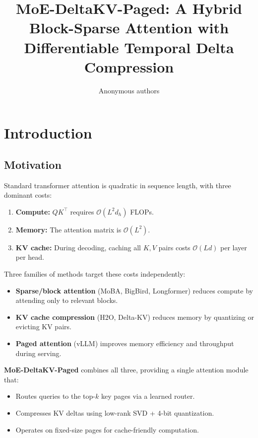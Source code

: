 \title{\textbf{MoE-DeltaKV-Paged: A Hybrid Block-Sparse Attention with Differentiable Temporal Delta Compression}}

\author{Anonymous authors}


\section{Introduction}

\subsection{Motivation}

Standard transformer attention is quadratic in sequence length, with three 
dominant costs:

\begin{enumerate}
\item \textbf{Compute:} $QK^\top$ requires $\mathcal{O}(L^2 d_h)$ FLOPs.
\item \textbf{Memory:} The attention matrix is $\mathcal{O}(L^2)$.
\item \textbf{KV cache:} During decoding, caching all $K, V$ pairs costs
  $\mathcal{O}(L d)$ per layer per head.

\end{enumerate}
Three families of methods target these costs independently:

\begin{itemize}
\item \textbf{Sparse/block attention} (MoBA, BigBird, Longformer) reduces compute
  by attending only to relevant blocks.
\item \textbf{KV cache compression} (H2O, Delta-KV) reduces memory by quantizing or
  evicting KV pairs.
\item \textbf{Paged attention} (vLLM) improves memory efficiency and throughput
  during serving.

\end{itemize}
\textbf{MoE-DeltaKV-Paged} combines all three, providing a single attention module 
that:
\begin{itemize}
\item Routes queries to the top-$k$ key pages via a learned router.
\item Compresses KV deltas using low-rank SVD + 4-bit quantization.
\item Operates on fixed-size pages for cache-friendly computation.

\end{itemize}
